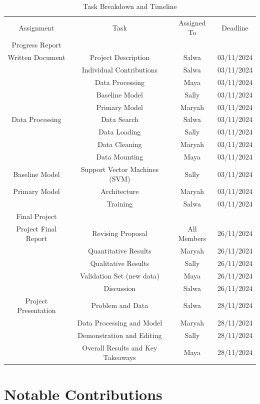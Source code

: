 \documentclass{article} %
\begin{document}
\begin{table}[h]
    \centering
    \begin{tabular}{cccc}
         Assignment &  Task &  Assigned To & Deadline \\
         Progress Report&&&\\
         Written Document &  Project Description&  Salwa & 03/11/2024\\
         &  Individual Contributions &  Salwa & 03/11/2024\\
         &  Data Processing &  Maya & 03/11/2024\\
         &  Baseline Model &  Sally & 03/11/2024\\
         &  Primary Model &  Maryah & 03/11/2024\\
         Data Processing &  Data Search &  Salwa & 03/11/2024\\
 & Data Loading & Sally&03/11/2024\\
         &  Data Cleaning &  Maryah& 03/11/2024\\
         &  Data Mounting &  Maya & 03/11/2024\\
 Baseline Model & Support Vector Machines (SVM) & Sally&03/11/2024\\
 Primary Model & Architecture & Maryah&03/11/2024\\
 & Training & Salwa &03/11/2024\\
 Final Project&&&\\
 Project Final Report & Revising Proposal & All Members &26/11/2024\\
 & Quantitative Results & Maryah &26/11/2024\\
 & Qualitative Results & Sally &26/11/2024\\
 & Validation Set (new data) & Maya &26/11/2024\\
 & Discussion & Salwa&26/11/2024\\
 Project Presentation & Problem and Data & Salwa&28/11/2024\\
 & Data Processing and Model & Maryah&28/11/2024\\
 & Demonstration and Editing & Sally&28/11/2024\\
 & Overall Results and Key Takeaways & Maya &28/11/2024\\
    \end{tabular}
    \caption{Task Breakdown and Timeline}
    \label{tab:my_label}
\end{table}

\section{Notable Contributions}
\end{document}
